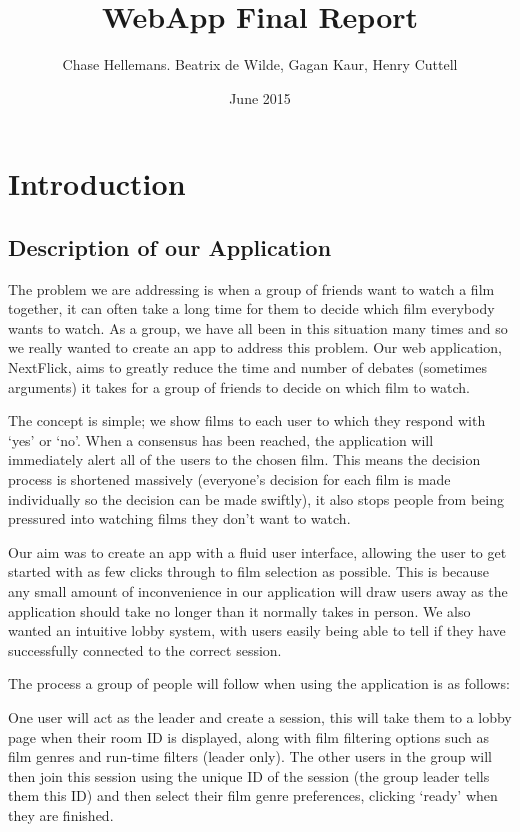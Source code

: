 \documentclass{article}
\title{WebApp Final Report}
\author{Chase Hellemans. Beatrix de Wilde, Gagan Kaur, Henry Cuttell}
\date{June 2015}
\begin{document}
\maketitle

\section{Introduction}
\subsection{Description of our Application}
The problem we are addressing is when a group of friends want to watch a film together, it can often take a long time for them to decide which film everybody wants to watch. As a group, we have all been in this situation many times and so we really wanted to create an app to address this problem. Our web application, NextFlick, aims to greatly reduce the time and number of debates (sometimes arguments) it takes for a group of friends to decide on which film to watch. 

The concept is simple; we show films to each user to which they respond with ‘yes’ or ‘no’. When a consensus has been reached, the application will immediately alert all of the users to the chosen film. This means the decision process is shortened massively (everyone’s decision for each film is made individually so the decision can be made swiftly), it also stops people from being pressured into watching films they don’t want to watch.

Our aim was to create an app with a fluid user interface, allowing the user to get started with as few clicks through to film selection as possible. This is because any small amount of inconvenience in our application will draw users away as the application should take no longer than it normally takes in person. We also wanted an intuitive lobby system, with users easily being able to tell if they have successfully connected to the correct session.

The process a group of people will follow when using the application is as follows:

One user will act as the leader and create a session, this will take them to a lobby page when their room ID is displayed, along with film filtering options such as film genres and run-time filters (leader only). The other users in the group will then join this session using the unique ID of the session (the group leader tells them this ID) and then select their film genre preferences, clicking ‘ready’ when they are finished.
\end{document}
